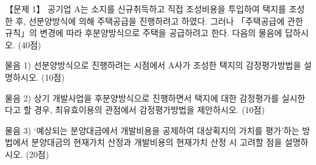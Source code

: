 \begin{longquestion}{【문제 1】}
공기업 A는 소지를 신규취득하고 직접 조성비용을 투입하여 택지를 조성한 후, 선분양방식에 의해 주택공급을 진행하려고 하였다. 그러나 「주택공급에 관한 규칙」의 변경에 따라 후분양방식으로 주택을 공급하려고 한다. 다음의 물음에 답하시오. (40점) \par
\medskip\noindent 물음 1) 선분양방식으로 진행하려는 시점에서 A사가 조성한 택지의 감정평가방법을 설명하시오. (10점) \par
\medskip\noindent 물음 2) 상기 개발사업을 후분양방식으로 진행하면서 택지에 대한 감정평가를 실시한다고 할 경우, 최유효이용의 관점에서 감정평가방법을 제안하시오. (10점) \par
\medskip\noindent 물음 3) ‘예상되는 분양대금에서 개발비용을 공제하여 대상획지의 가치를 평가’하는 방법에서 분양대금의 현재가치 산정과 개발비용의 현재가치 산정 시 고려할 점을 설명하시오. (20점) \par
\end{longquestion}

